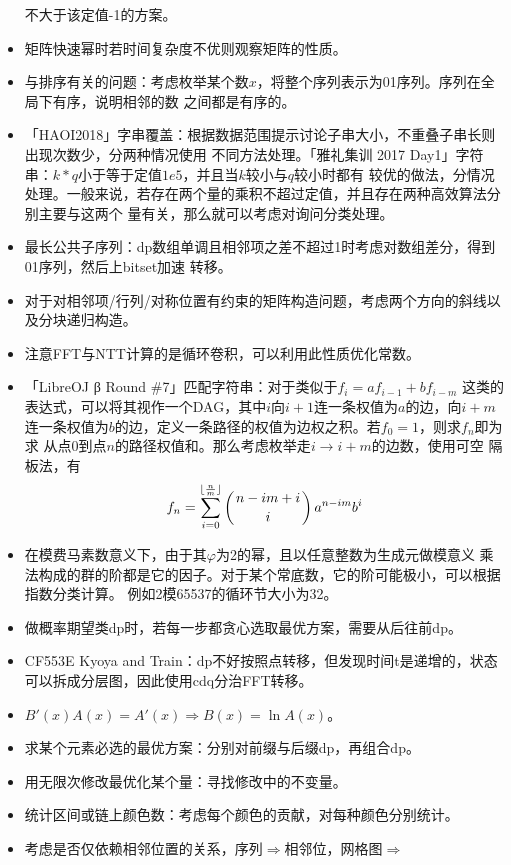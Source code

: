 \begin{itemize}
	不大于该定值-1的方案。
	\item 矩阵快速幂时若时间复杂度不优则观察矩阵的性质。
	\item 与排序有关的问题：考虑枚举某个数$x$，将整个序列表示为01序列。序列在全局下有序，说明相邻的数
	之间都是有序的。
	\item 「HAOI2018」字串覆盖：根据数据范围提示讨论子串大小，不重叠子串长则出现次数少，分两种情况使用
	不同方法处理。「雅礼集训 2017 Day1」字符串：$k*q$小于等于定值$1e5$，并且当$k$较小与$q$较小时都有
	较优的做法，分情况处理。一般来说，若存在两个量的乘积不超过定值，并且存在两种高效算法分别主要与这两个
	量有关，那么就可以考虑对询问分类处理。
	\item 最长公共子序列：dp数组单调且相邻项之差不超过1时考虑对数组差分，得到01序列，然后上bitset加速
	转移。
	\item 对于对相邻项/行列/对称位置有约束的矩阵构造问题，考虑两个方向的斜线以及分块递归构造。
	\item 注意FFT与NTT计算的是循环卷积，可以利用此性质优化常数。
	\item 「LibreOJ β Round \#7」匹配字符串：对于类似于$f_i=af_{i-1}+bf_{i-m}$
	这类的表达式，可以将其视作一个DAG，其中$i$向$i+1$连一条权值为$a$的边，向$i+m$
	连一条权值为$b$的边，定义一条路径的权值为边权之积。若$f_0=1$，则求$f_n$即为求
	从点0到点$n$的路径权值和。那么考虑枚举走$i\rightarrow i+m$的边数，使用可空
	隔板法，有
	\begin{displaymath}
		f_n=\sum_{i=0}^{\lfloor\frac{n}{m}\rfloor}{\left(n-im+i \atop i\right)a^{n-im}b^i}
	\end{displaymath}
	\item 在模费马素数意义下，由于其$\varphi$为2的幂，且以任意整数为生成元做模意义
	乘法构成的群的阶都是它的因子。对于某个常底数，它的阶可能极小，可以根据指数分类计算。
	例如2模65537的循环节大小为32。
	\item 做概率期望类dp时，若每一步都贪心选取最优方案，需要从后往前dp。
	\item CF553E Kyoya and Train：dp不好按照点转移，但发现时间t是递增的，状态
	可以拆成分层图，因此使用cdq分治FFT转移。
	\item $B'(x)A(x)=A'(x)\Rightarrow B(x)=\ln A(x)$。
	\item 求某个元素必选的最优方案：分别对前缀与后缀dp，再组合dp。
	\item 用无限次修改最优化某个量：寻找修改中的不变量。
	\item 统计区间或链上颜色数：考虑每个颜色的贡献，对每种颜色分别统计。
	\item 考虑是否仅依赖相邻位置的关系，序列$\Rightarrow$相邻位，网格图$\Rightarrow$

\end{itemize}
